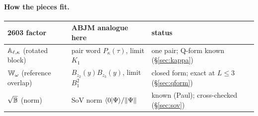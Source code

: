 \paragraph{How the pieces fit.}
\begin{center}
\begin{tabular}{lll}
\toprule
2603 factor & ABJM analogue here & status\\
\midrule
$\mathbb A_{\ell,\kappa}$ (rotated block) & pair word $P_\kappa(\tau)$, limit $K_1$ & one pair; Q-form known (\S\ref{sec:kappa})\\
$\mathbb W_\omega$ (reference overlap) & $B_{z_2}(y)B_{z_3}(y)$, limit $B_1^2$ & closed form; exact at $L\le3$ (\S\ref{sec:qform})\\
$\sqrt{\mathbb B}$ (norm) & SoV norm $\langle0|\Psi\rangle/\|\Psi\|$ & known (Paul); cross-checked (\S\ref{sec:sov})\\
\bottomrule
\end{tabular}
\end{center}
